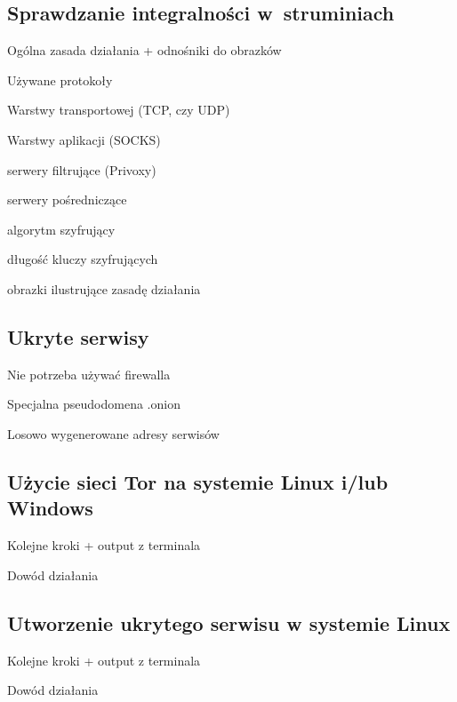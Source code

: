  \subsection{Sprawdzanie integralności w~struminiach}

   
\begin{description}
 \item Ogólna zasada działania + odnośniki do obrazków
 \item Używane protokoły
 \begin{description}
  \item Warstwy transportowej (TCP, czy UDP)
  \item Warstwy aplikacji (SOCKS)
  \item 
 \end{description}
 \item serwery filtrujące (Privoxy)
 \item serwery pośredniczące
 \item algorytm szyfrujący
 \item długość kluczy szyfrujących
 \item obrazki ilustrujące zasadę działania
\end{description}

\subsection{Ukryte serwisy}
\begin{description}
 \item Nie potrzeba używać firewalla
 \item Specjalna pseudodomena .onion
 \item Losowo wygenerowane adresy serwisów
\end{description}

\subsection{Użycie sieci Tor na systemie Linux i/lub Windows}
\begin{description}
 \item Kolejne kroki + output z terminala
 \item Dowód działania
\end{description}

\subsection{Utworzenie ukrytego serwisu w systemie Linux}
\begin{description}
 \item Kolejne kroki + output z terminala
 \item Dowód działania
\end{description}

